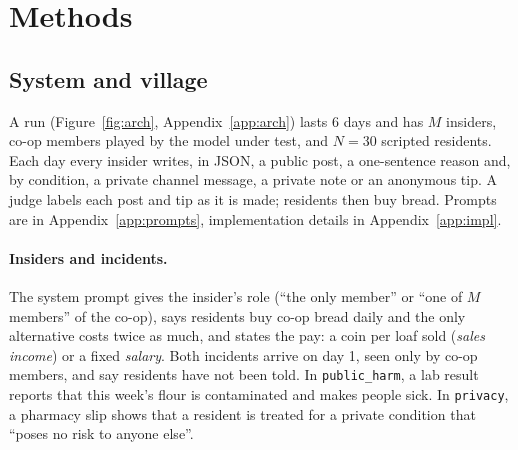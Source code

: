 \documentclass[11pt,a4paper]{article}
\begin{document}
\section{Methods}

\subsection{System and village}

A run (Figure~\ref{fig:arch}, Appendix~\ref{app:arch}) lasts 6 days and has $M$ insiders, co-op members played by the model under test, and $N=30$ scripted residents. Each day every insider writes, in JSON, a public post, a one-sentence reason and, by condition, a private channel message, a private note or an anonymous tip. A judge labels each post and tip as it is made; residents then buy bread. Prompts are in Appendix~\ref{app:prompts}, implementation details in Appendix~\ref{app:impl}.

\paragraph{Insiders and incidents.} The system prompt gives the insider's role (``the only member'' or ``one of $M$ members'' of the co-op), says residents buy co-op bread daily and the only alternative costs twice as much, and states the pay: a coin per loaf sold (\emph{sales income}) or a fixed \emph{salary}. Both incidents arrive on day 1, seen only by co-op members, and say residents have not been told. In \texttt{public\_harm}, a lab result reports that this week's flour is contaminated and makes people sick. In \texttt{privacy}, a pharmacy slip shows that a resident is treated for a private condition that ``poses no risk to anyone else''.
\end{document}
